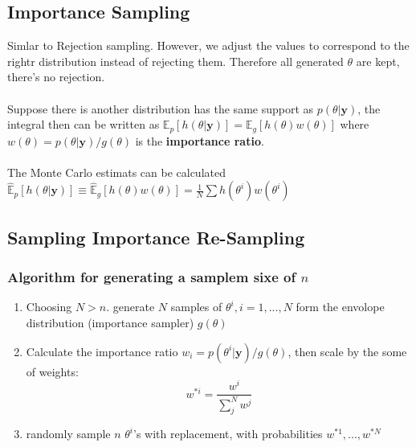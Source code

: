 \documentclass[12pt]{article}
\theoremstyle{definition}
\begin{document}
\subsection*{Importance Sampling}
    Simlar to Rejection sampling. However, we adjust the values to correspond to the rightr distribution instead of rejecting them. Therefore all generated $\theta$ are kept, there's no rejection.
    \\~\\Suppose there is another distribution has the same support as $p(\theta|\bm{y})$, the integral then can be written as $\mathbb{E}_p[h(\theta|\bm{y})] = \mathbb{E}_g[h(\theta)w(\theta)]$ where $w(\theta) = p(\theta|\bm{y})/g(\theta)$ is the \textbf{importance ratio}.
    \\~\\ The Monte Carlo estimats can be calculated $\hat{\mathbb{E}}_p[h(\theta|\bm{y})] \equiv \hat{\mathbb{E}}_g[h(\theta)w(\theta)] = \frac{1}{N}\sum h(\theta^i)w(\theta^i)$

\subsection*{Sampling Importance Re-Sampling}
\subsubsection*{Algorithm for generating a samplem sixe of $n$}
\begin{enumerate}
    \item Choosing $N > n$. generate $N$ samples of $\theta^i, i = 1,...,N$ form the envolope distribution (importance sampler) $g(\theta)$
    \item Calculate the importance ratio $w_i = p(\theta^i|\bm{y})/g(\theta)$, then scale by the some of weights:
        $$w^{*i} = \frac{w^i}{\sum_j^N w^j}$$
    \item randomly sample $n$ $\theta^i$'s with replacement, with probabilities $w^{*1},...,w^{*N}$
\end{enumerate}
\end{document}
